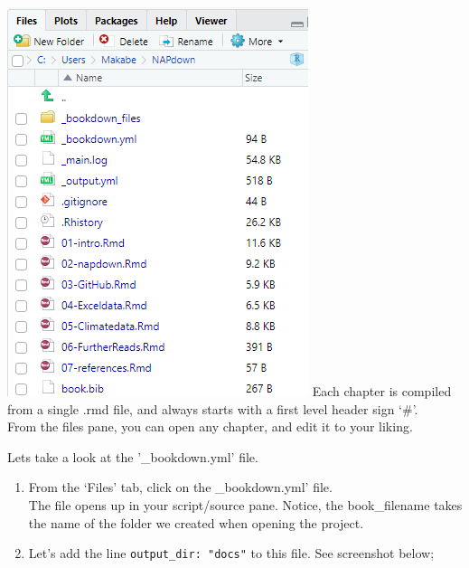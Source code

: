 \documentclass[
]{book}
\providecommand{\tightlist}{%
  \setlength{\itemsep}{0pt}\setlength{\parskip}{0pt}}
\begin{document}
\includegraphics{tutorial_screenshots/files_panel.png}
Each chapter is compiled from a single .rmd file, and always starts with a first level header sign `\#'.\\
From the files pane, you can open any chapter, and edit it to your liking.

Lets take a look at the '\_bookdown.yml' file.

\begin{enumerate}
\def\labelenumi{\arabic{enumi}.}
\setcounter{enumi}{6}
\tightlist
\item
  From the `Files' tab, click on the \_bookdown.yml' file.\\
  The file opens up in your script/source pane. Notice, the book\_filename takes the name of the folder we created when opening the project.\\
\item
  Let's add the line \texttt{output\_dir:\ "docs"} to this file.
  See screenshot below;
\end{enumerate}
\end{document}
